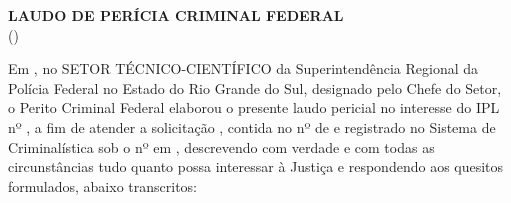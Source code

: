\noindent\textbf{\pftitle}

\begin{center}
	\textbf{LAUDO DE PERÍCIA CRIMINAL FEDERAL}\\
	(\pfdocsubtype)
\end{center}

Em 
\pfdocdate,	no SETOR TÉCNICO-CIENTÍFICO da Superintendência
Regional da Polícia Federal no Estado do Rio Grande do Sul, designado pelo Chefe do Setor,	o Perito Criminal Federal 
\pfauthor\space elaborou o presente laudo pericial no interesse do IPL nº \pfipl, a fim de atender a solicitação 
\pfclient, contida no 
\pfexptype\space nº \pfexpnum\space de \pfexpdate\space	e registrado no Sistema de Criminalística sob o nº 
\pfregnum\space em \pfregdate, descrevendo com verdade e com todas as circunstâncias tudo quanto possa interessar à Justiça e respondendo aos	quesitos formulados, abaixo transcritos:


